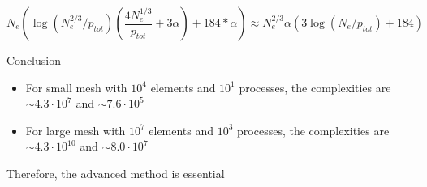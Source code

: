 \documentclass[12pt]{article}
\begin{document}
\[ N_e(    \log(N_e^{2/3} / p_{tot})(\frac{4 N_e^{1/3}}{p_{tot}} + 3 \alpha ) + 184 * \alpha)  \approx  N_e^{2/3} \alpha (3 \log(N_e / p_{tot}) + 184)  \]

\noindent
Conclusion
\begin{itemize}
	\item For small mesh with $10^4$ elements and $10^1$ processes, the complexities are $\sim 4.3\cdot 10^7$ and $\sim 7.6 \cdot 10^5$
	\item For large mesh with $10^7$ elements and $10^3$ processes, the complexities are $\sim 4.3\cdot 10^{10}$ and $\sim 8.0 \cdot 10^7$
\end{itemize}
\noindent
Therefore, the advanced method is essential
\end{document}
